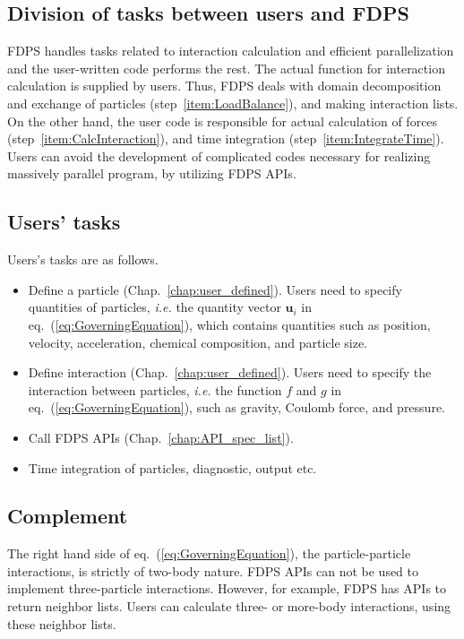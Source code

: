\subsection{Division of tasks between users and FDPS}
FDPS handles tasks related to interaction calculation and efficient parallelization and the user-written code performs the rest. The actual function for interaction calculation is supplied by users. Thus, FDPS deals with domain decomposition and exchange of particles (step~\ref{item:LoadBalance}), and making interaction lists. On the other hand, the user code is responsible for actual calculation of forces (step~\ref{item:CalcInteraction}), and time integration (step~\ref{item:IntegrateTime}). Users can avoid the development of complicated codes necessary for realizing massively parallel program, by utilizing FDPS APIs.

\subsection{Users' tasks}
\label{subsec:things_to_do_by_users}

Users's tasks are as follows.
\begin{itemize}
\item Define a particle (Chap.~\ref{chap:user_defined}). Users need to specify quantities of particles, \textit{i.e.} the quantity vector $\bm{u}_i$ in eq.~(\ref{eq:GoverningEquation}), which contains quantities such as position, velocity, acceleration, chemical composition, and particle size.

\item Define interaction (Chap.~\ref{chap:user_defined}). Users need to specify the interaction between particles, \textit{i.e.} the function $f$ and $g$ in eq.~(\ref{eq:GoverningEquation}), such as gravity, Coulomb force, and pressure.

\item Call FDPS APIs (Chap.~\ref{chap:API_spec_list}).

\item Time integration of particles, diagnostic, output etc.

\end{itemize}

\subsection{Complement}
The right hand side of eq.~(\ref{eq:GoverningEquation}), the particle-particle interactions, is strictly of two-body nature. FDPS APIs can not be used to implement three-particle interactions. However, for example, FDPS has APIs to return neighbor lists. Users can calculate three- or more-body interactions, using these neighbor lists.

